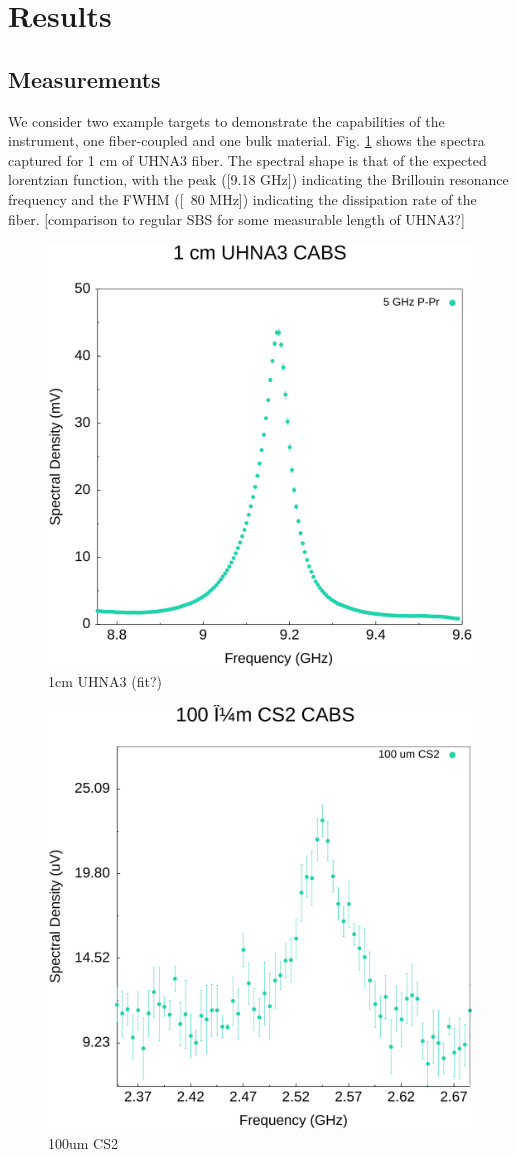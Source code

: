 \documentclass[%
  reprint,
  superscriptaddress,
  amsmath,amssymb,
  aps,
  prapplied,
]{revtex4-2}
\begin{document}
\section{Results}\label{Results}
\subsection*{Measurements}\label{Results:Measurements}

We consider two example targets to demonstrate the capabilities of the instrument, one fiber-coupled and one bulk material. Fig. \ref{fig:1cmUHNA3} shows the spectra captured for 1 cm of UHNA3 fiber. The spectral shape is that of the expected lorentzian function, with the peak ([9.18 GHz]) indicating the Brillouin resonance frequency and the FWHM ([~80 MHz]) indicating the dissipation rate of the fiber. [comparison to regular SBS for some measurable length of UHNA3?]

\begin{figure}[t]
  \centering
  \includegraphics[width=.45\textwidth]{1cmUHNA3.pdf}
  \caption{1cm UHNA3 (fit?)}\label{fig:1cmUHNA3}
\end{figure}

\begin{figure}[t]
  \centering
  \includegraphics[width=.45\textwidth]{100umCS2.pdf}
  \caption{100um CS2}\label{fig:100umCS2}
\end{figure}
\end{document}
